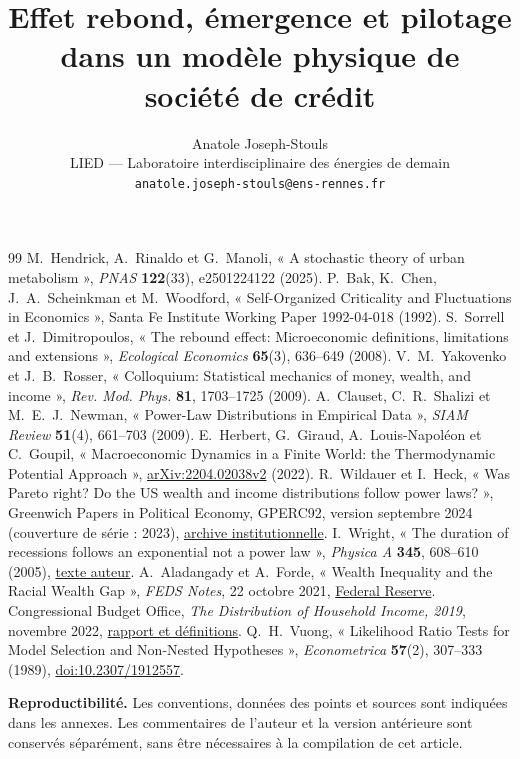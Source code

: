 \documentclass[10pt,a4paper]{article}
\title{\vspace{-1.2cm}Effet rebond, émergence et pilotage\\[2pt]
dans un modèle physique de société de crédit}
\author{Anatole Joseph-Stouls\\
\small LIED --- Laboratoire interdisciplinaire des énergies de demain\\
\small \texttt{anatole.joseph-stouls@ens-rennes.fr}}
\date{}
\begin{document}
\maketitle
\vspace{-0.7cm}

\FloatBarrier
\clearpage
\begin{thebibliography}{99}\small
{} M.~Hendrick, A.~Rinaldo et G.~Manoli,
  « A stochastic theory of urban metabolism », \emph{PNAS} \textbf{122}(33),
  e2501224122 (2025).
 P.~Bak, K.~Chen, J.~A.~Scheinkman et M.~Woodford,
  « Self-Organized Criticality and Fluctuations in Economics »,
  Santa Fe Institute Working Paper 1992-04-018 (1992).
 S.~Sorrell et J.~Dimitropoulos,
  « The rebound effect: Microeconomic definitions, limitations and extensions »,
  \emph{Ecological Economics} \textbf{65}(3), 636--649 (2008).
 V.~M.~Yakovenko et J.~B.~Rosser,
  « Colloquium: Statistical mechanics of money, wealth, and income »,
  \emph{Rev. Mod. Phys.} \textbf{81}, 1703--1725 (2009).
 A.~Clauset, C.~R.~Shalizi et M.~E.~J.~Newman,
  « Power-Law Distributions in Empirical Data », \emph{SIAM Review}
  \textbf{51}(4), 661--703 (2009).
 E.~Herbert, G.~Giraud, A.~Louis-Napoléon et C.~Goupil,
  « Macroeconomic Dynamics in a Finite World: the Thermodynamic Potential
  Approach », \href{https://arxiv.org/abs/2204.02038v2}{arXiv:2204.02038v2} (2022).
 R.~Wildauer et I.~Heck,
  « Was Pareto right? Do the US wealth and income distributions follow power
  laws? », Greenwich Papers in Political Economy, GPERC92, version septembre
  2024 (couverture de série : 2023),
  \href{https://gala.gre.ac.uk/id/eprint/38597/}{archive institutionnelle}.
 I.~Wright, « The duration of recessions follows an
  exponential not a power law », \emph{Physica A} \textbf{345}, 608--610
  (2005), \href{https://arxiv.org/abs/cond-mat/0311585}{texte auteur}.
 A.~Aladangady et A.~Forde, « Wealth Inequality and the
  Racial Wealth Gap », \emph{FEDS Notes}, 22 octobre 2021,
  \href{https://www.federalreserve.gov/econres/notes/feds-notes/wealth-inequality-and-the-racial-wealth-gap-20211022.html}{Federal Reserve}.
 Congressional Budget Office, \emph{The Distribution of
  Household Income, 2019}, novembre 2022,
  \href{https://www.cbo.gov/publication/58781}{rapport et définitions}.
 Q.~H.~Vuong, « Likelihood Ratio Tests for Model Selection
  and Non-Nested Hypotheses », \emph{Econometrica} \textbf{57}(2),
  307--333 (1989), \href{https://doi.org/10.2307/1912557}{doi:10.2307/1912557}.
\end{thebibliography}

\noindent\textbf{Reproductibilité.} Les conventions, données des points et
sources sont indiquées dans les annexes. Les commentaires de l'auteur et
la version antérieure sont conservés séparément, sans être nécessaires à
la compilation de cet article.
\clearpage

\end{document}
